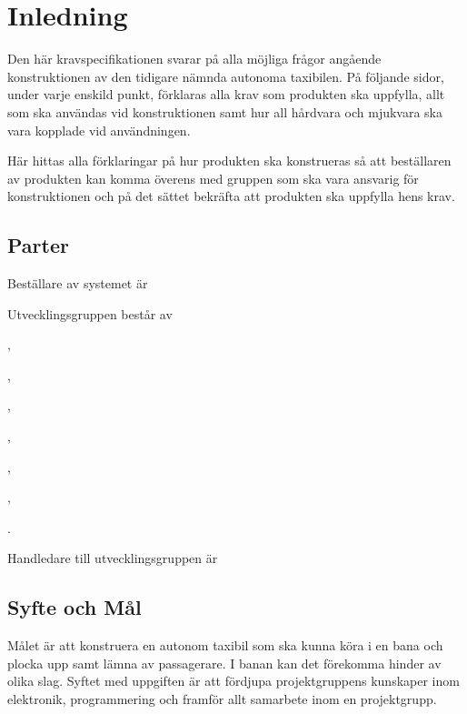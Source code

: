 \documentclass[kravspec/krav.tex]{subfiles}
\begin{document}
\section{Inledning}
Den här kravspecifikationen svarar på alla möjliga frågor angående
konstruktionen av den tidigare nämnda autonoma taxibilen. På följande sidor,
under varje enskild punkt, förklaras alla krav som produkten ska uppfylla,
allt som ska användas vid konstruktionen samt hur all hårdvara och mjukvara
ska vara kopplade vid användningen.

Här hittas alla förklaringar på  hur produkten ska konstrueras så att
beställaren av produkten kan komma överens med gruppen som ska vara
ansvarig för konstruktionen och på det sättet bekräfta att produkten ska
uppfylla hens krav.

\subsection{Parter}
Beställare av systemet är
\begin{list}{}
    \item \bfseries \VARbestallare
\end{list}\vspace{4mm}

\noindent
Utvecklingsgruppen består av
{\bfseries\begin{list}{}
   \item \VARprojektledare,
   \item \VARdokumentansvarig,
   \item \VARgranssnitt,
   \item \VARhardware,
   \item \VARelektronik,
   \item \VARkundansvarig,
   \item \VARarkitekt.
\end{list}}\vspace{4mm}

\noindent
Handledare till utvecklingsgruppen är
\begin{list}{}	
	\item \bfseries \VARhandledare
\end{list}\vspace{4mm}

\subsection{Syfte och Mål}
Målet är att konstruera en autonom taxibil som ska kunna köra i en bana och
plocka upp samt lämna av passagerare. I banan kan det förekomma hinder av olika
slag. Syftet med uppgiften är att fördjupa projektgruppens kunskaper inom
elektronik, programmering och framför allt samarbete inom en projektgrupp.
\end{document}
